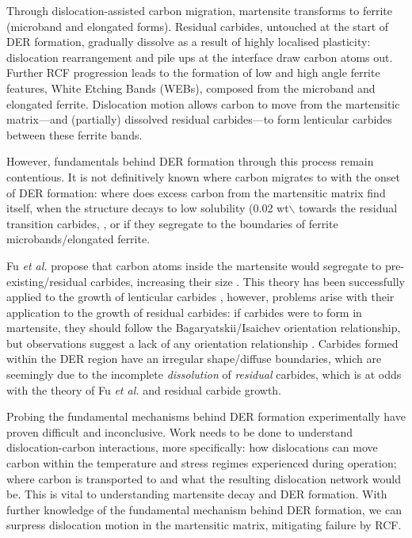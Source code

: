 \documentclass[a4paper,11pt]{article}
\begin{document}
Through dislocation-assisted carbon migration, martensite transforms to ferrite (microband and
elongated forms). Residual carbides, untouched at the start of DER formation, gradually dissolve
as a result of highly localised plasticity: dislocation rearrangement and pile ups at the
interface draw carbon atoms out. Further RCF progression leads to the formation of low and high
angle ferrite features, White Etching Bands (WEBs), composed from the microband and elongated
ferrite. Dislocation motion allows carbon to move from the martensitic
matrix---and (partially) dissolved residual carbides---to form lenticular carbides between these
ferrite bands. 

However, fundamentals behind DER formation through this process remain contentious. It is not
definitively known where carbon migrates to with the onset of DER formation: where does excess
carbon from the martensitic matrix find itself, when the structure decays to low solubility
(0.02 wt$\backslash$%
towards the residual transition carbides, \cite{fu17_strain_induc_marten_decay_bearin}, or if they
segregate to the boundaries of ferrite microbands/elongated ferrite.


Fu \emph{et al.} propose that carbon atoms inside the martensite would segregate to
pre-existing/residual carbides, increasing their size
\cite{fu17_strain_induc_marten_decay_bearin}. This theory has been successfully applied to the
growth of lenticular carbides \cite{Fu2017}, however, problems arise with their application to the
growth of residual carbides: if carbides were to form in martensite, they should follow the
Bagaryatskii/Isaichev orientation relationship, but observations suggest a lack of any orientation
relationship \cite{Bhadeshia2018}. Carbides formed within the DER region have an irregular
shape/diffuse boundaries, which are seemingly due to the incomplete \emph{dissolution} of \emph{residual}
carbides, which is at odds with the theory of Fu \emph{et al.} and residual carbide growth.



Probing the fundamental mechanisms behind DER formation experimentally have proven difficult and
inconclusive. Work needs to be done to understand dislocation-carbon interactions, more specifically: how
dislocations can move carbon within the temperature and stress regimes experienced during
operation; where carbon is transported to and what the resulting dislocation network would be. This is vital to
understanding martensite decay and DER formation. With further knowledge of the fundamental
mechanism behind DER formation, we can surpress dislocation motion in the martensitic
matrix, mitigating failure by RCF.
\end{document}
